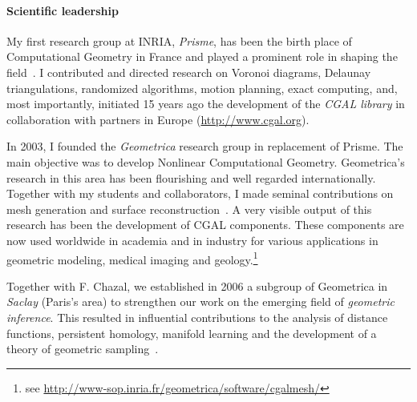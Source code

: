 
\paragraph{Scientific leadership} \mbox{}


My first research group at INRIA, {\em Prisme}, has been the birth place of Computational Geometry in France and played a prominent role in shaping the field~\cite{by-ag-98}. 
I contributed and directed research on Voronoi diagrams, Delaunay triangulations, randomized algorithms, motion planning, exact computing, and, most importantly, initiated 15 years ago the development of the {\em CGAL library} in collaboration with partners in Europe (\url{http://www.cgal.org}{}).

In 2003, I founded the {\em Geometrica} research group in replacement of Prisme. The main objective was to develop Nonlinear Computational Geometry. 
 Geometrica's research in this area has been flourishing and well regarded internationally. Together with my students and collaborators, I made seminal contributions on mesh generation and surface reconstruction~\cite{geometrica-ecg-book}. A very visible output of this research has been the development of CGAL components. These components are now used worldwide in academia and in industry for various applications in geometric modeling, medical imaging and geology.\footnote{see \url{http://www-sop.inria.fr/geometrica/software/cgalmesh/}}

Together with F. Chazal, we established in 2006 a subgroup of Geometrica in {\em Saclay} (Paris's area)  to strengthen our work on  the emerging field of {\em geometric inference}.  This resulted in influential contributions to the analysis of distance functions, persistent homology, manifold learning and the development of a theory of geometric sampling~\cite{geometrica-bgo-09,geometrica-ccl09}.
\newpage


